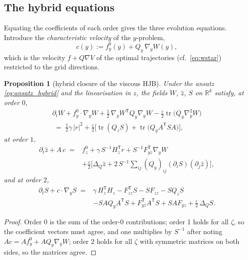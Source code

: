 \documentclass[11pt,a4paper]{article}
\newcommand{\R}{\mathbb{R}}
\newcommand{\tr}{\operatorname{tr}}
\newcommand{\T}{^{\mathsf T}}
\newcommand{\zh}{\hat{z}}
\newcommand{\eps}{\varepsilon}
\newcommand{\abs}[1]{\left\lvert #1 \right\rvert}
\newcommand{\grad}{\nabla}
\newcommand{\gy}{\nabla_{\!y}}
\newcommand{\Hy}{\nabla_{\!y}^2}
\theoremstyle{plain}
\newtheorem{proposition}{Proposition}
\theoremstyle{definition}
\theoremstyle{remark}
\begin{document}
\subsection{The hybrid equations}

Equating the coefficients of each order gives the three evolution equations. Introduce the \emph{characteristic velocity} of the $y$-problem,
\begin{equation}
  c(y) := f_y^0(y) + Q_y\,\gy W(y),
  \label{eq:characteristic}
\end{equation}
which is the velocity $f+Q\grad V$ of the optimal trajectories (cf.\ \eqref{eq:wstar}) restricted to the grid directions.

\begin{proposition}[hybrid closure of the viscous HJB]
Under the ansatz \eqref{eq:ansatz_hybrid} and the linearisation in $z$, the fields $W$, $\zh$, $S$ on $\R^k$ satisfy, at order $0$,
\begin{equation}
\begin{aligned}
  \partial_t W + f_y^0\cdot\gy W + \tfrac12\,\gy W\T Q_y\gy W - \tfrac{\eps}{2}\tr\big(Q_y\Hy W\big) \\
  \;=\; \tfrac12\gamma\,\abs{r}^2 + \tfrac{\eps}{2}\Big[\tr(Q_zS) + \tr\big(Q_yA\T SA\big)\Big],
\end{aligned}
\label{eq:hyb_W}
\end{equation}
at order $1$,
\begin{equation}
\begin{aligned}
  \partial_t\zh + A\,c \;={}& f_z^0 + \gamma\,S^{-1}H_z\T r + S^{-1}F_{yz}\T\gy W \\
  &+ \tfrac{\eps}{2}\Big[\Delta_Q\zh + 2\,S^{-1}\!\sum_{ij}(Q_y)_{ij}(\partial_iS)(\partial_j\zh)\Big],
\end{aligned}
\label{eq:hyb_z}
\end{equation}
and at order $2$,
\begin{equation}
\begin{aligned}
  \partial_t S + c\cdot\gy S \;={}& \gamma\,H_z\T H_z - F_{zz}\T S - SF_{zz} - SQ_zS \\
  &- SAQ_yA\T S + F_{yz}\T A\T S + SAF_{yz} + \tfrac{\eps}{2}\,\Delta_Q S .
\end{aligned}
\label{eq:hyb_S}
\end{equation}
\end{proposition}
\begin{proof}
Order 0 is the sum of the order-0 contributions; order 1 holds for all $\zeta$, so the coefficient vectors must agree, and one multiplies by $S^{-1}$ after noting $A c = A f_y^0 + AQ_y\gy W$; order 2 holds for all $\zeta$ with symmetric matrices on both sides, so the matrices agree.
\end{proof}
\end{document}
